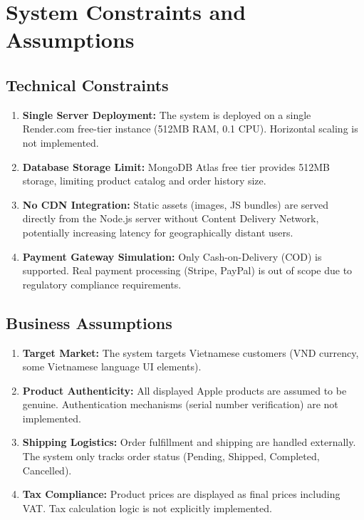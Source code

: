 \section{System Constraints and Assumptions}

\subsection{Technical Constraints}

\begin{enumerate}
    \item \textbf{Single Server Deployment:} The system is deployed on a single Render.com free-tier instance (512MB RAM, 0.1 CPU). Horizontal scaling is not implemented.
    
    \item \textbf{Database Storage Limit:} MongoDB Atlas free tier provides 512MB storage, limiting product catalog and order history size.
    
    \item \textbf{No CDN Integration:} Static assets (images, JS bundles) are served directly from the Node.js server without Content Delivery Network, potentially increasing latency for geographically distant users.
    
    \item \textbf{Payment Gateway Simulation:} Only Cash-on-Delivery (COD) is supported. Real payment processing (Stripe, PayPal) is out of scope due to regulatory compliance requirements.
\end{enumerate}

\subsection{Business Assumptions}

\begin{enumerate}
    \item \textbf{Target Market:} The system targets Vietnamese customers (VND currency, some Vietnamese language UI elements).
    
    \item \textbf{Product Authenticity:} All displayed Apple products are assumed to be genuine. Authentication mechanisms (serial number verification) are not implemented.
    
    \item \textbf{Shipping Logistics:} Order fulfillment and shipping are handled externally. The system only tracks order status (Pending, Shipped, Completed, Cancelled).
    
    \item \textbf{Tax Compliance:} Product prices are displayed as final prices including VAT. Tax calculation logic is not explicitly implemented.
\end{enumerate}

